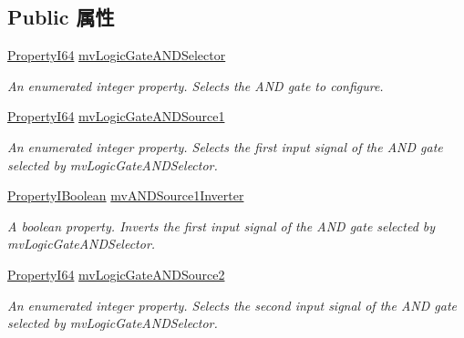 \subsection*{Public 属性}
\begin{DoxyCompactItemize}
\item 
\hyperlink{group___common_interface_ga81749b2696755513663492664a18a893}{Property\+I64} \hyperlink{classmv_i_m_p_a_c_t_1_1acquire_1_1_gen_i_cam_1_1mv_logic_gate_control_abba6d54999f450e8f08934c0af5bec0d}{mv\+Logic\+Gate\+A\+N\+D\+Selector}
\begin{DoxyCompactList}\small\item\em An enumerated integer property. Selects the A\+N\+D gate to configure. \end{DoxyCompactList}\item 
\hyperlink{group___common_interface_ga81749b2696755513663492664a18a893}{Property\+I64} \hyperlink{classmv_i_m_p_a_c_t_1_1acquire_1_1_gen_i_cam_1_1mv_logic_gate_control_aff3a8ed67455967905fcf463c85ff0f3}{mv\+Logic\+Gate\+A\+N\+D\+Source1}
\begin{DoxyCompactList}\small\item\em An enumerated integer property. Selects the first input signal of the A\+N\+D gate selected by mv\+Logic\+Gate\+A\+N\+D\+Selector. \end{DoxyCompactList}\item 
\hyperlink{group___common_interface_ga44f9437e24b21b6c93da9039ec6786aa}{Property\+I\+Boolean} \hyperlink{classmv_i_m_p_a_c_t_1_1acquire_1_1_gen_i_cam_1_1mv_logic_gate_control_acd58d1cddd078640f1080fb2f140dcd5}{mv\+A\+N\+D\+Source1\+Inverter}
\begin{DoxyCompactList}\small\item\em A boolean property. Inverts the first input signal of the A\+N\+D gate selected by mv\+Logic\+Gate\+A\+N\+D\+Selector. \end{DoxyCompactList}\item 
\hyperlink{group___common_interface_ga81749b2696755513663492664a18a893}{Property\+I64} \hyperlink{classmv_i_m_p_a_c_t_1_1acquire_1_1_gen_i_cam_1_1mv_logic_gate_control_a99264f802944238bb3811996ad3bda19}{mv\+Logic\+Gate\+A\+N\+D\+Source2}
\begin{DoxyCompactList}\small\item\em An enumerated integer property. Selects the second input signal of the A\+N\+D gate selected by mv\+Logic\+Gate\+A\+N\+D\+Selector. \end{DoxyCompactList}\item 

\end{DoxyCompactItemize}
